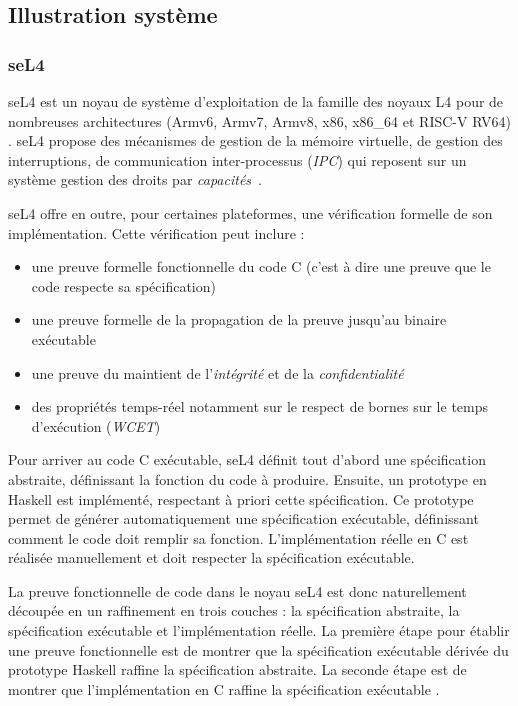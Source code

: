 		\subsection{Illustration système}	

			\subsubsection{seL4}
	seL4 \cite{sel4website} est un noyau de système d'exploitation de la famille des noyaux L4 pour de nombreuses architectures (Armv6, Armv7, Armv8, x86, x86\_64 et RISC-V RV64) \cite{sel4hardware}. seL4 propose des mécanismes de gestion de la mémoire virtuelle, de gestion des interruptions, de communication inter-processus (\emph{IPC}) qui reposent sur un système gestion des droits par \emph{capacités}~\cite{capabilities}.

	seL4 offre en outre, pour certaines plateformes, une vérification formelle de son implémentation. Cette vérification peut inclure :
	\begin{itemize}
		\item{une preuve formelle fonctionnelle du code C (c'est à dire une preuve que le code respecte sa spécification) \cite{sel4}}
		\item{une preuve formelle de la propagation de la preuve jusqu'au binaire exécutable\cite{sel4binary}}
		\item{une preuve du maintient de l'\emph{intégrité} et de la \emph{confidentialité} \cite{sel4integrity}}
		\item{des propriétés temps-réel notamment sur le respect de bornes sur le temps d'exécution (\emph{WCET})\cite{sel4wcet}}
	\end{itemize}

	Pour arriver au code C exécutable, seL4 définit tout d'abord une spécification abstraite, définissant la fonction du code à produire. Ensuite, un prototype en Haskell est implémenté, respectant à priori cette spécification. Ce prototype permet de générer automatiquement une spécification exécutable, définissant comment le code doit remplir sa fonction. L'implémentation réelle en C est réalisée manuellement et doit respecter la spécification exécutable.

	La preuve fonctionnelle de code dans le noyau seL4 est donc naturellement découpée en un raffinement en trois couches : la spécification abstraite, la spécification exécutable et l'implémentation réelle. La première étape pour établir une preuve fonctionnelle est de montrer que la spécification exécutable dérivée du prototype Haskell raffine la spécification abstraite. La seconde étape est de montrer que l'implémentation en C raffine la spécification exécutable \cite{sel4}.

